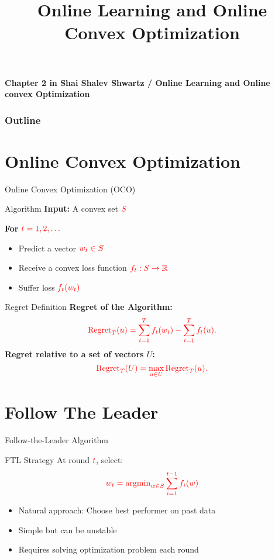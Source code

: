 \documentclass[handout]{beamer}
\title{Online Learning and Online Convex Optimization}
\date{}
\begin{document}
\begin{frame}
  \titlepage
{\bf Chapter 2 in Shai Shalev Shwartz / Online Learning and Online convex Optimization} 
\end{frame}

\begin{frame}
  \frametitle{Outline}
  \tableofcontents[pausesections]
\end{frame}

\section{Online Convex Optimization}
\begin{frame}{Online Convex Optimization (OCO)}
\begin{block}{Algorithm}
\textbf{Input:} A convex set \( \textcolor{red}{S} \)

\textbf{For} \( \textcolor{red}{t = 1,2,\dots} \)
\begin{itemize}
    \item Predict a vector \( \textcolor{red}{w_t \in S} \)
    \item Receive a convex loss function \( \textcolor{red}{f_t: S \to \mathbb{R}} \)
    \item Suffer loss \( \textcolor{red}{f_t(w_t)} \)
\end{itemize}
\end{block}
\end{frame}

\begin{frame}{Regret Definition}
    \textbf{Regret of the Algorithm:}
    \begin{equation}
        \textcolor{red}{\text{Regret}_T(u) = \sum_{t=1}^{T} f_t(w_t) - \sum_{t=1}^{T} f_t(u).}
    \end{equation}
    \textbf{Regret relative to a set of vectors \( U \):}
    \begin{equation}
        \textcolor{red}{\text{Regret}_T(U) = \max_{u \in U} \text{Regret}_T(u).}
    \end{equation}
\end{frame}


\newcommand{\mathred}[1]{\textcolor{red}{#1}} %
\section{Follow The Leader}
\begin{frame}{Follow-the-Leader Algorithm}
\begin{block}{FTL Strategy}
At round $\mathred{t}$, select:
\[
\mathred{w_t = \operatorname{argmin}_{w \in S} \sum_{i=1}^{t-1} f_i(w)}
\]
\end{block}

\begin{itemize}
\item Natural approach: Choose best performer on past data
\item Simple but can be unstable
\item Requires solving optimization problem each round
\end{itemize}
\end{frame}
\end{document}
